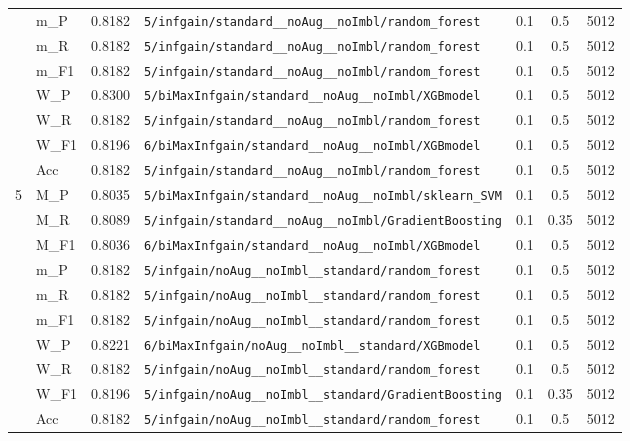 \begin{table}[htbp]
\begin{tabular}{|c|l|c|>{\ttfamily\footnotesize}p{7.2cm}|c|c|c|}
 & m\_P & 0.8182 & \texttt{5/infgain/standard\_\_noAug\_\_noImbl/random\_forest} & 0.1 & 0.5  & 5012 \\ 
 & m\_R & 0.8182 & \texttt{5/infgain/standard\_\_noAug\_\_noImbl/random\_forest} & 0.1 & 0.5  & 5012 \\ 
 & m\_F1 & 0.8182 & \texttt{5/infgain/standard\_\_noAug\_\_noImbl/random\_forest} & 0.1 & 0.5  & 5012 \\ 
 & W\_P & 0.8300 & \texttt{5/biMaxInfgain/standard\_\_noAug\_\_noImbl/XGBmodel} & 0.1 & 0.5  & 5012 \\ 
 & W\_R & 0.8182 & \texttt{5/infgain/standard\_\_noAug\_\_noImbl/random\_forest} & 0.1 & 0.5  & 5012 \\ 
 & W\_F1 & 0.8196 & \texttt{6/biMaxInfgain/standard\_\_noAug\_\_noImbl/XGBmodel} & 0.1 & 0.5  & 5012 \\ 
 & Acc & 0.8182 & \texttt{5/infgain/standard\_\_noAug\_\_noImbl/random\_forest} & 0.1 & 0.5  & 5012 \\ 
\hline
\multirow{10}{*}{5} & M\_P & 0.8035 & \texttt{5/biMaxInfgain/standard\_\_noAug\_\_noImbl/sklearn\_SVM} & 0.1 & 0.5  & 5012 \\ 
 & M\_R & 0.8089 & \texttt{5/infgain/standard\_\_noAug\_\_noImbl/GradientBoosting} & 0.1 & 0.35  & 5012 \\ 
 & M\_F1 & 0.8036 & \texttt{6/biMaxInfgain/standard\_\_noAug\_\_noImbl/XGBmodel} & 0.1 & 0.5  & 5012 \\ 
 & m\_P & 0.8182 & \texttt{5/infgain/noAug\_\_noImbl\_\_standard/random\_forest} & 0.1 & 0.5  & 5012 \\ 
 & m\_R & 0.8182 & \texttt{5/infgain/noAug\_\_noImbl\_\_standard/random\_forest} & 0.1 & 0.5  & 5012 \\ 
 & m\_F1 & 0.8182 & \texttt{5/infgain/noAug\_\_noImbl\_\_standard/random\_forest} & 0.1 & 0.5  & 5012 \\ 
 & W\_P & 0.8221 & \texttt{6/biMaxInfgain/noAug\_\_noImbl\_\_standard/XGBmodel} & 0.1 & 0.5  & 5012 \\ 
 & W\_R & 0.8182 & \texttt{5/infgain/noAug\_\_noImbl\_\_standard/random\_forest} & 0.1 & 0.5  & 5012 \\ 
 & W\_F1 & 0.8196 & \texttt{5/infgain/noAug\_\_noImbl\_\_standard/GradientBoosting} & 0.1 & 0.35  & 5012 \\ 
 & Acc & 0.8182 & \texttt{5/infgain/noAug\_\_noImbl\_\_standard/random\_forest} & 0.1 & 0.5  & 5012 \\ 
\hline
\end{tabular}
\end{table}